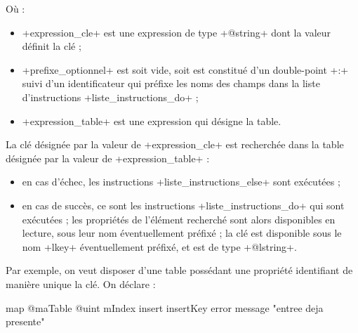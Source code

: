 Où :
\begin{itemize}
  \item \ggs+expression_cle+ est une expression de type \ggs+@string+ dont la valeur définit la clé ;
  \item \ggs+prefixe_optionnel+ est soit vide, soit est constitué d'un double-point \ggs+:+ suivi d'un identificateur qui préfixe les noms des champs dans la liste d'instructions \ggs+liste_instructions_do+ ;
  \item \ggs+expression_table+ est une expression qui désigne la table.
\end{itemize}

La clé désignée par la valeur de \ggs+expression_cle+ est recherchée dans la table désignée par la valeur de \ggs+expression_table+ :
\begin{itemize}
  \item en cas d'échec, les instructions \ggs+liste_instructions_else+ sont exécutées ;
  \item en cas de succès, ce sont les instructions \ggs+liste_instructions_do+ qui sont exécutées ; les propriétés de l'élément recherché sont alors disponibles en lecture, sous leur nom éventuellement préfixé ; la clé est disponible sous le nom \ggs+lkey+ éventuellement préfixé, et est de type \ggs+@lstring+.
\end{itemize}

%
%


Par exemple, on veut disposer d'une table possédant une propriété identifiant de manière unique la clé. On déclare :
\begin{galgas}
map @maTable {
  @uint mIndex
  insert insertKey error message "entree deja presente"
}
\end{galgas}

